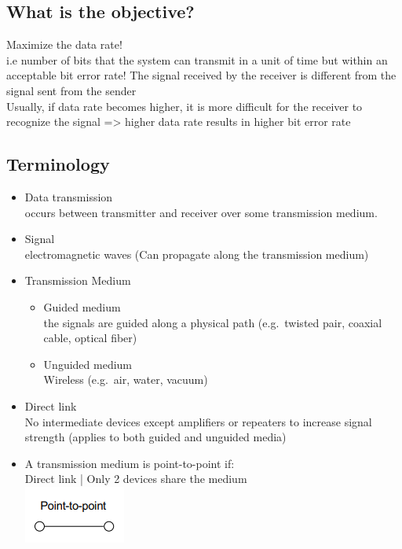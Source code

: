 \documentclass[11pt]{article}
\begin{document}
\subsection{What is the objective?}
Maximize the data rate! \\
i.e number of bits that the system can transmit in a unit of time but within an acceptable bit error rate!
The signal received by the receiver is different from the signal sent from the sender \\
Usually, if data rate becomes higher, it is more difficult for the receiver to recognize the signal => higher data rate results in higher bit error rate
\subsection{Terminology}
\begin{itemize}
    \item Data transmission \\
    occurs between transmitter and receiver over some transmission medium.
    \item Signal \\
    electromagnetic waves (Can propagate along the transmission medium)
    \item Transmission Medium
    \begin{itemize}
        \item Guided medium \\
        the signals are guided along a physical path (e.g.\ twisted pair, coaxial cable, optical fiber)
        \item Unguided medium \\
        Wireless (e.g.\ air, water, vacuum)
    \end{itemize}
    \item Direct link \\
    No intermediate devices except amplifiers or repeaters to increase signal strength (applies to both guided and unguided media)
    \item A transmission medium is point-to-point if: \\
    Direct link | Only 2 devices share the medium \\
    \includegraphics[width=\textwidth]{point-to-point}

\end{itemize}
\end{document}
